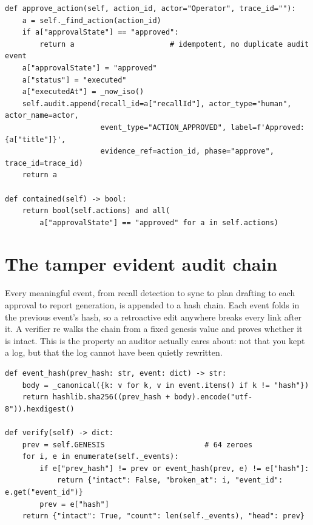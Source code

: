 \documentclass[11pt]{article}
\begin{document}
\begin{lstlisting}[style=py,caption={The approval gate is the only path to execution (backend/app/state.py).}]
def approve_action(self, action_id, actor="Operator", trace_id=""):
    a = self._find_action(action_id)
    if a["approvalState"] == "approved":
        return a                      # idempotent, no duplicate audit event
    a["approvalState"] = "approved"
    a["status"] = "executed"
    a["executedAt"] = _now_iso()
    self.audit.append(recall_id=a["recallId"], actor_type="human", actor_name=actor,
                      event_type="ACTION_APPROVED", label=f'Approved: {a["title"]}',
                      evidence_ref=action_id, phase="approve", trace_id=trace_id)
    return a

def contained(self) -> bool:
    return bool(self.actions) and all(
        a["approvalState"] == "approved" for a in self.actions)
\end{lstlisting}

\section{The tamper evident audit chain}

Every meaningful event, from recall detection to sync to plan drafting to each approval to report
generation, is appended to a hash chain. Each event folds in the previous event's hash, so a
retroactive edit anywhere breaks every link after it. A verifier re walks the chain from a fixed
genesis value and proves whether it is intact. This is the property an auditor actually cares about:
not that you kept a log, but that the log cannot have been quietly rewritten.

\begin{lstlisting}[style=py,caption={The hash chain (backend/app/audit.py).}]
def event_hash(prev_hash: str, event: dict) -> str:
    body = _canonical({k: v for k, v in event.items() if k != "hash"})
    return hashlib.sha256((prev_hash + body).encode("utf-8")).hexdigest()

def verify(self) -> dict:
    prev = self.GENESIS                       # 64 zeroes
    for i, e in enumerate(self._events):
        if e["prev_hash"] != prev or event_hash(prev, e) != e["hash"]:
            return {"intact": False, "broken_at": i, "event_id": e.get("event_id")}
        prev = e["hash"]
    return {"intact": True, "count": len(self._events), "head": prev}
\end{lstlisting}
\end{document}
